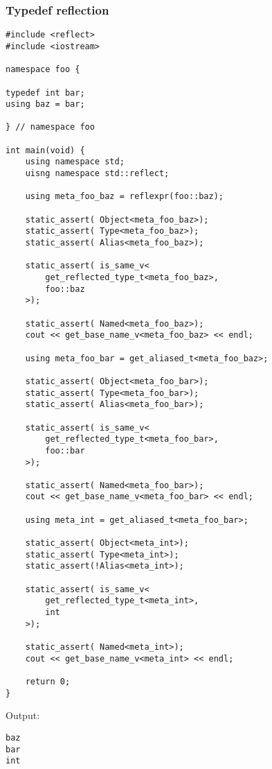 \subsubsection{Typedef reflection}

\begin{verbatim}
#include <reflect>
#include <iostream>

namespace foo {

typedef int bar;
using baz = bar;

} // namespace foo

int main(void) {
	using namespace std;
	uisng namespace std::reflect;

	using meta_foo_baz = reflexpr(foo::baz);

	static_assert( Object<meta_foo_baz>);
	static_assert( Type<meta_foo_baz>);
	static_assert( Alias<meta_foo_baz>);

	static_assert( is_same_v<
		get_reflected_type_t<meta_foo_baz>,
		foo::baz
	>);

	static_assert( Named<meta_foo_baz>);
	cout << get_base_name_v<meta_foo_baz> << endl;

	using meta_foo_bar = get_aliased_t<meta_foo_baz>;

	static_assert( Object<meta_foo_bar>);
	static_assert( Type<meta_foo_bar>);
	static_assert( Alias<meta_foo_bar>);

	static_assert( is_same_v<
		get_reflected_type_t<meta_foo_bar>,
		foo::bar
	>);

	static_assert( Named<meta_foo_bar>);
	cout << get_base_name_v<meta_foo_bar> << endl;

	using meta_int = get_aliased_t<meta_foo_bar>;

	static_assert( Object<meta_int>);
	static_assert( Type<meta_int>);
	static_assert(!Alias<meta_int>);

	static_assert( is_same_v<
		get_reflected_type_t<meta_int>,
		int
	>);

	static_assert( Named<meta_int>);
	cout << get_base_name_v<meta_int> << endl;

	return 0;
}

\end{verbatim}

Output:

\begin{verbatim}
baz
bar
int
\end{verbatim}


